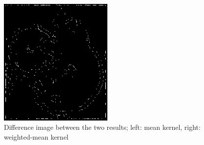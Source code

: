 \documentclass[12pt,a4paper]{article}
\begin{document}
\begin{figure}[ht]
    \centering
    \includegraphics[width=0.5\textwidth]{img_edge_comparison}
    \caption{Difference image between the two results; left: mean kernel, right: weighted-mean kernel}
    \label{fig:diff}
\end{figure}
\end{document}
